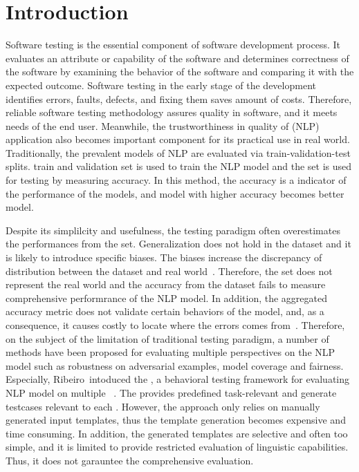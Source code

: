 \section{Introduction}
\label{sec:intro}

Software testing is the essential component of software development
process.  It evaluates an attribute or capability of the software and
determines correctness of the software by examining the behavior of
the software and comparing it with the expected outcome. Software
testing in the early stage of the development identifies errors,
faults, defects, and fixing them saves amount of costs. Therefore,
reliable software testing methodology assures quality in software, and
it meets needs of the end user. Meanwhile, the trustworthiness in
quality of \nlp (NLP) application also becomes important component for
its practical use in real world. Traditionally, the prevalent models
of NLP are evaluated via train-validation-test splits. train and
validation set is used to train the NLP model and the \ho set is used
for testing by measuring accuracy. In this method, the accuracy is a
indicator of the performance of the models, and model with higher
accuracy becomes better model.

Despite its simplilcity and usefulness, the testing paradigm often
overestimates the performances from the \ho set. Generalization does
not hold in the \ho dataset and it is likely to introduce specific
biases. The biases increase the discrepancy of distribution between
the dataset and real world~\cite{recht2019imagenetbias}. Therefore,
the \ho set does not represent the real world and the accuracy from
the dataset fails to measure comprehensive performrance of the NLP
model. In addition, the aggregated accuracy metric does not validate
certain behaviors of the model, and, as a consequence, it causes
costly to locate where the errors comes
from~\cite{wu2019errudite}. Therefore, on the subject of the
limitation of traditional testing paradigm, a number of methods have
been proposed for evaluating multiple perspectives on the NLP model
such as robustness on adversarial examples, model coverage and
fairness.  Especially, Ribeiro~\etal intoduced the \Cklst, a
behavioral testing framework for evaluating NLP model on multiple
\lcs~\cite{marcoACL2020checklist}. The \Cklst provides predefined
task-relevant \lcs and generate testcases relevant to each \lc.
However, the approach only relies on manually generated input
templates, thus the template generation becomes expensive and time
consuming. In addition, the generated templates are selective and
often too simple, and it is limited to provide restricted evaluation
of linguistic capabilities. Thus, it does not garauntee the
comprehensive evaluation.

